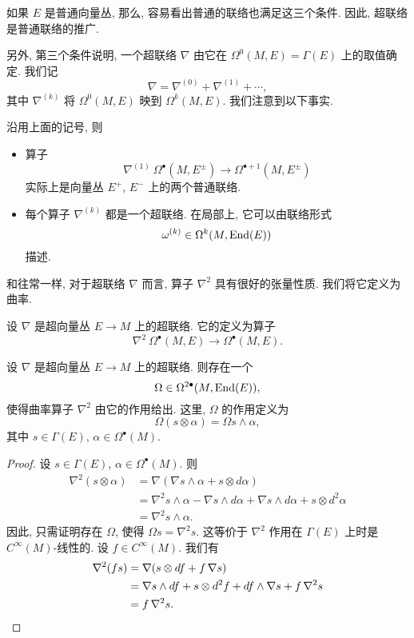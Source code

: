 如果 $E$ 是普通向量丛, 那么, 容易看出普通的联络也满足这三个条件.
因此, 超联络是普通联络的推广.

另外, 第三个条件说明, 一个超联络 $\nabla$ 由它在 
$\Omega^0 (M, E) = \Gamma (E)$ 上的取值确定. 我们记
\[ \nabla = \nabla^{(0)} + \nabla^{(1)} + \cdots, \]
其中 $\nabla^{(k)}$ 将 $\Omega^0 (M, E)$ 映到 $\Omega^k (M, E)$.
我们注意到以下事实.

\begin{remark}
    沿用上面的记号, 则
    \begin{itemize}
        \item 
            算子
            \[ \nabla^{(1)} \: \Omega^\bullet (M, E^{\pm}) 
                \to \Omega^{\bullet+1} (M, E^{\pm}) \]
            实际上是向量丛 $E^+$, $E^-$ 上的两个普通联络.
        \item
            每个算子 $\nabla^{(k)}$ 都是一个超联络.
            在局部上, 它可以由联络形式
            \[ \omega^{(k)} \in \Omega^k (M, \operatorname{End}(E)) \]
            描述. \varqed
    \end{itemize}
\end{remark}

和往常一样, 对于超联络 $\nabla$ 而言,
算子 $\nabla^2$ 具有很好的张量性质. 我们将它定义为曲率.

\begin{definition}
    设 $\nabla$ 是超向量丛 $E \to M$ 上的超联络. 它的定义为算子
    \[ \nabla^2 \: \Omega^\bullet (M, E) \to \Omega^\bullet (M, E). \]
\end{definition}

\begin{proposition}
    设 $\nabla$ 是超向量丛 $E \to M$ 上的超联络. 则存在一个
    \[ \Omega \in \Omega^{2\bullet} (M, \operatorname{End} (E)), \]
    使得曲率算子 $\nabla^2$ 由它的作用给出. 这里, $\Omega$ 的作用定义为
    \[ \Omega (s \otimes \alpha) = \Omega s \wedge \alpha, \]
    其中 $s \in \Gamma (E)$, $\alpha \in \Omega^\bullet (M)$.
\end{proposition}

\begin{proof}
    设 $s \in \Gamma (E)$, $\alpha \in \Omega^\bullet (M)$. 则
    \begin{align*}
        \nabla^2 (s \otimes \alpha)
        &= \nabla (\nabla s \wedge \alpha + s \otimes d \alpha) \\
        &= \nabla^2 s \wedge \alpha - \nabla s \wedge d \alpha
            + \nabla s \wedge d \alpha + s \otimes d^2 \alpha \\
        &= \nabla^2 s \wedge \alpha.
    \end{align*}
    因此, 只需证明存在 $\Omega$, 使得 $\Omega s = \nabla^2 s$.
    这等价于 $\nabla^2$ 作用在 $\Gamma (E)$ 上时是 $C^\infty (M)$-线性的.
    设 $f \in C^\infty (M)$. 我们有
    \begin{align*}
        \nabla^2 (fs)
        &= \nabla ( s \otimes df + f \, \nabla s ) \\
        &= \nabla s \wedge df + s \otimes d^2f 
            + df \wedge \nabla s + f \, \nabla^2 s \\
        &= f \, \nabla^2 s. \qedhere
    \end{align*}
\end{proof}


